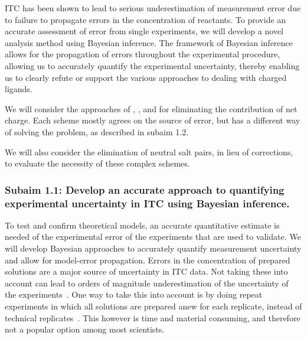 \documentclass[10pt,final]{article}
\begin{document}
ITC has been shown to lead to serious underestimation of measurement error due to failure to propagate errors in the concentration of reactants\autocite{Myszka2003a,Tellinghuisen2011a}. To provide an accurate assessment of error from single experiments, we will develop a novel analysis method using Bayesian inference.
%
The framework of Bayesian inference allows for the propagation of errors throughout the experimental procedure, allowing us to accurately quantify the experimental uncertainty, thereby enabling us to clearly refute or support the various approaches to dealing with charged ligands.

We will consider the approaches of \textcite{Reif2013a}, \textcite{Rocklin2013a}, and \textcite{Lin2014a} for eliminating the contribution of net charge.  Each scheme mostly agrees on the source of error, but has a different way of solving the problem, as described in subaim 1.2. 

We will also consider the elimination of neutral salt pairs, in lieu of corrections, to evaluate the necessity of these complex schemes.


\subsubsection*{Subaim 1.1: Develop an accurate approach to quantifying experimental uncertainty in ITC using Bayesian inference.}
To test and confirm theoretical models, an accurate quantitative estimate is needed of the experimental error of the experiments that are used to validate.
%
We will develop Bayesian approaches to accurately quantify measurement uncertainty and allow for model-error propagation. 
Errors in the concentration of prepared solutions are a major source of uncertainty in ITC data. Not taking these into account can lead to orders of magnitude underestimation of the uncertainty of the experiments~\autocite{Myszka2003a,Tellinghuisen2011a}.
One way to take this into account is by doing repeat experiments in which all solutions are prepared anew for each replicate, instead of technical replicates~\autocite{Vaux2012a}. This however is time and material consuming, and therefore not a popular option among most scientists. 
\end{document}

